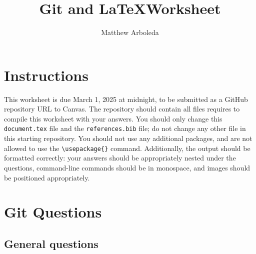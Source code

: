 \documentclass[10pt,twocolumn]{article}
\title{Git and \LaTeX Worksheet}
\author{Matthew Arboleda}
\affiliation{Occidental College}
\begin{document}
\maketitle

\section{Instructions}

This worksheet is due March 1, 2025 at midnight, to be submitted as a GitHub repository URL to Canvas. The repository should contain all files requires to compile this worksheet with your answers. You should only change this \texttt{document.tex} file and the  \texttt{references.bib} file; do not change any other file in this starting repository. You should not use any additional packages, and are not allowed to use the \texttt{{\textbackslash}usepackage\{\}} command. Additionally, the output should be formatted correctly: your answers should be appropriately nested under the questions, command-line commands should be in monospace, and images should be positioned appropriately.

\section{Git Questions}

\subsection{General questions}
\end{document}
